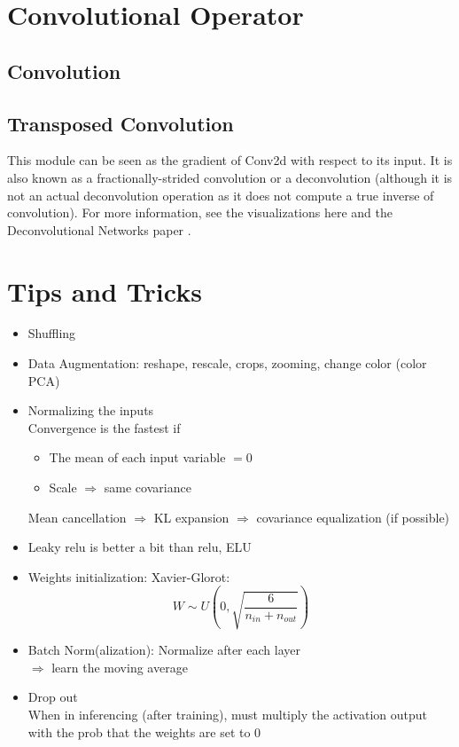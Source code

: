 \section{Convolutional Operator}
\subsection{Convolution}
\cite{lecun1998gradient}

\subsection{Transposed Convolution}
This module can be seen as the gradient of Conv2d with respect to its input. It is also known as a fractionally-strided convolution or a deconvolution (although it is not an actual deconvolution operation as it does not compute a true inverse of convolution). For more information, see the visualizations here \cite{dumoulin2016guide} and the Deconvolutional Networks paper \cite{zeiler2010deconvolutional}.

\section{Tips and Tricks}
\begin{itemize}
	\item Shuffling
	\item Data Augmentation: reshape, rescale, crops, zooming, change color (color \ac{PCA})
	\item Normalizing the inputs\\
	Convergence is the fastest if
	\begin{itemize}
		\item The mean of each input variable $=0$
		\item Scale $\Rightarrow$ same covariance
	\end{itemize}
	Mean cancellation $\Rightarrow$ \ac{KL} expansion $\Rightarrow$ covariance equalization (if possible)
	\item Leaky \ac{relu} is better a bit than \ac{relu}, ELU
	\item Weights initialization: Xavier-Glorot:
	\[ W \sim U\left(0, \sqrt{\frac{6}{n_{in} + n_{out}}}\right) \]
	\item Batch Norm(alization): Normalize after each layer\\
	$\Rightarrow$ learn the moving average
	\item Drop out\\
	\note When in inferencing (after training), must multiply the activation output with the \ac{prob} that the weights are set to 0
\end{itemize}
